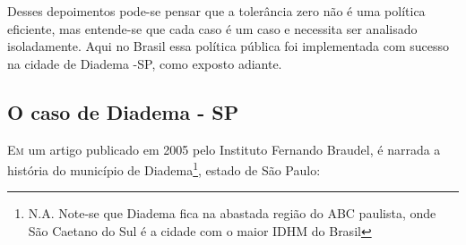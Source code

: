 \documentclass[
	12pt,				%
	openright,			%
	twoside,			%
	a4paper,			%
	chapter=TITLE,		%
	section=TITLE,		%
	subsection=TITLE,	%
	subsubsection=TITLE,%
	spanish,            %
	english,			%
	brazil				%
	]{abntex2}
\begin{document}
\par
Desses depoimentos pode-se pensar que a tolerância zero não é uma política eficiente, mas entende-se que cada caso é um caso e necessita ser analisado isoladamente.
Aqui no Brasil essa política pública foi implementada com sucesso na cidade de Diadema -SP, como exposto adiante.

\subsection{O caso de Diadema - SP}
\lettrine[lines=2, lhang=0.33, loversize=0.25]{E}{m} um artigo publicado em 2005 pelo Instituto Fernando Braudel, é narrada a história do município de Diadema\footnote{N.A. Note-se que Diadema fica na abastada região do ABC paulista, onde São Caetano do Sul é a cidade com o maior IDHM do Brasil}, estado de São Paulo:
\end{document}
